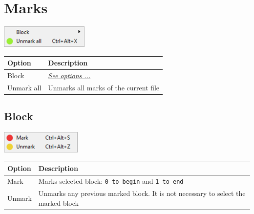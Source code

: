 
\hypertarget{menu_marks}{}
\section{Marks}

\includegraphics[scale=0.50]{./res/menu_marks.png}\\

\begin{scriptsize}
  \begin{tabularx}{\textwidth}{>{\hsize=0.3\hsize}X>{\hsize=0.7\hsize}X}\\
    \hline
    \textbf{Option} & \textbf{Description} \\
    \hline
    Block & \textit{\href{\#menu\_marks\_block}{See options ...}} \\
    Unmark all & Unmarks all marks of the current file \\
    \hline
  \end{tabularx}
\end{scriptsize}


\hypertarget{menu_marks_block}{}
\subsection{Block}

\includegraphics[scale=0.50]{./res/menu_marks_block.png}\\

\begin{scriptsize}
  \begin{tabularx}{\textwidth}{>{\hsize=0.2\hsize}X>{\hsize=0.8\hsize}X}\\
    \hline
    \textbf{Option} & \textbf{Description} \\
    \hline
    Mark & Marks selected block: \texttt{0 to begin} and \texttt{1 to end} \\
    Unmark & Unmarks any previous marked block. It is not necessary to select the marked block \\
    \hline
  \end{tabularx}
\end{scriptsize}
